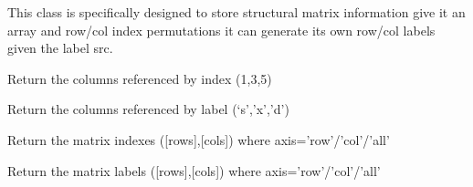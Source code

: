 \documentclass[a4paper,11pt,english]{sphinxmanual}
\begin{document}

\begin{fulllineitems}
\label{modules_doc:cbmpy.CBDataStruct.StructMatrix}
This class is specifically designed to store structural matrix information
give it an array and row/col index permutations it can generate its own
row/col labels given the label src.

\begin{fulllineitems}
\label{modules_doc:cbmpy.CBDataStruct.StructMatrix.getColsByIdx}
Return the columns referenced by index (1,3,5)

\end{fulllineitems}


\begin{fulllineitems}
\label{modules_doc:cbmpy.CBDataStruct.StructMatrix.getColsByName}
Return the columns referenced by label (`s','x','d')

\end{fulllineitems}


\begin{fulllineitems}
\label{modules_doc:cbmpy.CBDataStruct.StructMatrix.getIndexes}
Return the matrix indexes ({[}rows{]},{[}cols{]}) where axis='row'/'col'/'all'

\end{fulllineitems}


\begin{fulllineitems}
\label{modules_doc:cbmpy.CBDataStruct.StructMatrix.getLabels}
Return the matrix labels ({[}rows{]},{[}cols{]}) where axis='row'/'col'/'all'

\end{fulllineitems}


\end{fulllineitems}
\end{document}
